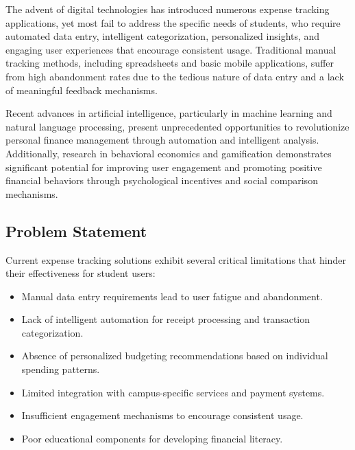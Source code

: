 \documentclass[10pt,twocolumn,twoside,a4paper]{article}
\begin{document}
The advent of digital technologies has introduced numerous expense tracking applications, yet most fail to address the specific needs of students, who require automated data entry, intelligent categorization, personalized insights, and engaging user experiences that encourage consistent usage. Traditional manual tracking methods, including spreadsheets and basic mobile applications, suffer from high abandonment rates due to the tedious nature of data entry and a lack of meaningful feedback mechanisms.

Recent advances in artificial intelligence, particularly in machine learning and natural language processing, present unprecedented opportunities to revolutionize personal finance management through automation and intelligent analysis. Additionally, research in behavioral economics and gamification demonstrates significant potential for improving user engagement and promoting positive financial behaviors through psychological incentives and social comparison mechanisms.

\subsection{Problem Statement}
Current expense tracking solutions exhibit several critical limitations that hinder their effectiveness for student users:
\begin{itemize}[leftmargin=*]
  \item Manual data entry requirements lead to user fatigue and abandonment.
  \item Lack of intelligent automation for receipt processing and transaction categorization.
  \item Absence of personalized budgeting recommendations based on individual spending patterns.
  \item Limited integration with campus-specific services and payment systems.
  \item Insufficient engagement mechanisms to encourage consistent usage.
  \item Poor educational components for developing financial literacy.
\end{itemize}
\end{document}
